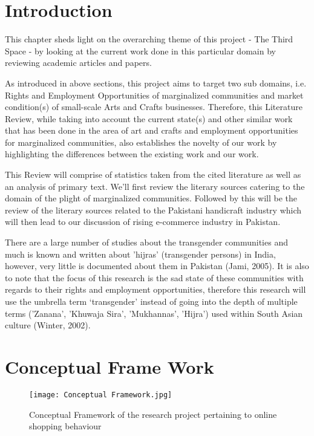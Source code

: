     
\section{Introduction}

This chapter sheds light on the overarching theme of this project - The Third Space - by looking at the current work done in this particular domain by reviewing academic articles and papers.

As introduced in above sections, this project aims to target two sub domains, i.e. Rights and Employment Opportunities of marginalized communities and market condition(s) of small-scale Arts and Crafts businesses. Therefore, this Literature Review, while taking into account the current state(s) and other similar work that has been done in the area of art and crafts and employment opportunities for marginalized communities, also establishes the novelty of our work by highlighting the differences between the existing work and our work.

This Review will comprise of statistics taken from the cited literature as well as an analysis of primary text. We'll first review the literary sources catering to the domain of the plight of marginalized communities. Followed by this will be the review of the literary sources related to the Pakistani handicraft industry which will then lead to our discussion of rising e-commerce industry in Pakistan.

There are a large number of studies about the transgender communities and much is known and written about 'hijras' (transgender persons) in India, however, very little is documented about them in Pakistan (Jami, 2005). It is also to note that the focus of this research is the sad state of these communities with regards to their rights and employment opportunities, therefore this research will use the umbrella term `transgender' instead of going into the depth of multiple terms ('Zanana', 'Khuwaja Sira', 'Mukhannas', 'Hijra') used within South Asian culture (Winter, 2002). 

\section{Conceptual Frame Work}

\begin{figure}
  \caption{Conceptual Framework of the research project pertaining to online shopping behaviour}
  \texttt{[image: Conceptual Framework.jpg]}
  \centering
\end{figure}

